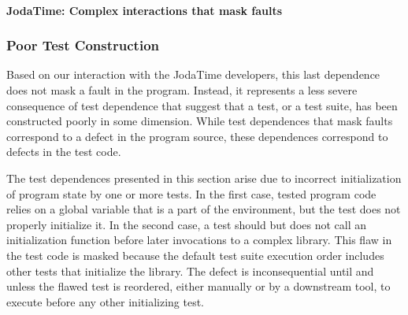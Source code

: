 

\newcommand{\jodatime}{JodaTime\xspace}
\paragraph{\jodatime: Complex interactions that mask faults}
\label{sec:jodatime}


\subsubsection{Poor Test Construction}\label{sec:examples:initialization}

Based on our interaction with the \jodatime developers, this last
dependence does not
mask a fault in the program.  Instead, it represents a less severe consequence of test
dependence that suggest that a test, or a test suite, 
has been constructed poorly in some dimension.  While test dependences that mask faults
correspond to a defect
in the program source, these dependences correspond to defects in the test code.
%


The test dependences presented in this section arise due to incorrect initialization
of program state by one or more tests. In the first case,
%
tested program code relies on a
global variable that is a part of the environment, but the test does
not properly initialize it.  In the second case, a test should but
does not call
an initialization function before later invocations to a complex library.
This flaw in the test code is masked because the default test suite execution
order includes other tests that initialize the library.  The defect is
inconsequential until and unless the flawed test is reordered, either manually or by
a downstream tool, to execute before any other initializing test.


